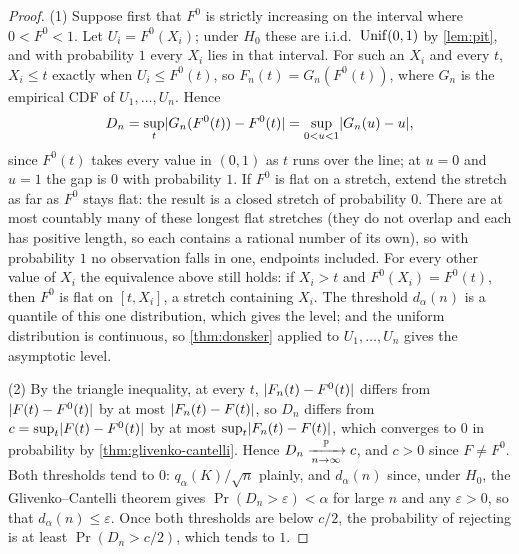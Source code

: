 \begin{proof}
(1) Suppose first that $F^0$ is strictly increasing on the interval where $0 < F^0 < 1$.
Let $U_i = F^0(X_i)$; under $H_0$ these are i.i.d.\ $\mathrm{Unif}(0, 1)$ by \cref{lem:pit}, and with probability $1$ every $X_i$ lies in that interval.
For such an $X_i$ and every $t$, $X_i \leq t$ exactly when $U_i \leq F^0(t)$, so $F_n(t) = G_n(F^0(t))$, where $G_n$ is the empirical CDF of $U_1, \ldots, U_n$.
Hence
\[
D_n = \sup_t\lvert G_n(F^0(t)) - F^0(t)\rvert = \sup_{0 < u < 1}\lvert G_n(u) - u\rvert,
\]
since $F^0(t)$ takes every value in $(0, 1)$ as $t$ runs over the line; at $u = 0$ and $u = 1$ the gap is $0$ with probability $1$.
If $F^0$ is flat on a stretch, extend the stretch as far as $F^0$ stays flat: the result is a closed stretch of probability $0$.
There are at most countably many of these longest flat stretches (they do not overlap and each has positive length, so each contains a rational number of its own), so with probability $1$ no observation falls in one, endpoints included.
For every other value of $X_i$ the equivalence above still holds: if $X_i > t$ and $F^0(X_i) = F^0(t)$, then $F^0$ is flat on $[t, X_i]$, a stretch containing $X_i$.
The threshold $d_\alpha(n)$ is a quantile of this one distribution, which gives the level; and the uniform distribution is continuous, so \cref{thm:donsker} applied to $U_1, \ldots, U_n$ gives the asymptotic level.

(2) By the triangle inequality, at every $t$, $\lvert F_n(t) - F^0(t)\rvert$ differs from $\lvert F(t) - F^0(t)\rvert$ by at most $\lvert F_n(t) - F(t)\rvert$, so $D_n$ differs from $c = \sup_t\lvert F(t) - F^0(t)\rvert$ by at most $\sup_t\lvert F_n(t) - F(t)\rvert$, which converges to $0$ in probability by \cref{thm:glivenko-cantelli}.
Hence $D_n \xrightarrow [n \to \infty ]{\mathbb{P}} c$, and $c > 0$ since $F \neq F^0$.
Both thresholds tend to $0$: $q_\alpha(K)/\sqrt{n}$ plainly, and $d_\alpha(n)$ since, under $H_0$, the Glivenko--Cantelli theorem gives $\Pr(D_n > \varepsilon) < \alpha$ for large $n$ and any $\varepsilon > 0$, so that $d_\alpha(n) \leq \varepsilon$.
Once both thresholds are below $c/2$, the probability of rejecting is at least $\Pr(D_n > c/2)$, which tends to $1$.
\end{proof}


